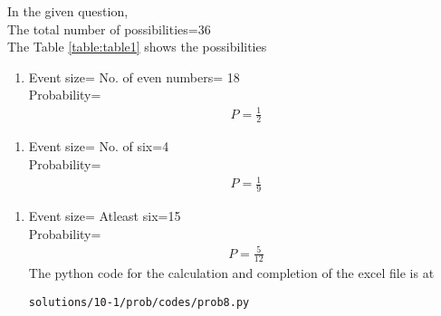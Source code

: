  In the given question,
\\
The total number of possibilities=36
\\
The Table \ref{table:table1} shows the possibilities

\begin{table}[ht!]
\centering

\caption{}
\label{table:table1}
\end{table}
\begin{enumerate}
\item Event size= No. of even numbers= 18
\\
Probability=
\begin{align}
P=\frac{1}{2}
\end{align}
\end{enumerate}
\begin{enumerate}
\item Event size= No. of six=4
\\
Probability=
\begin{align}
P=\frac{1}{9}
\end{align}
\end{enumerate}
\begin{enumerate}
\item Event size= Atleast six=15
\\
Probability=
\begin{align}
P=\frac{5}{12}
\end{align}
The python code for the calculation and completion of the excel file is at
\begin{lstlisting}
solutions/10-1/prob/codes/prob8.py
\end{lstlisting}

\end{enumerate}
